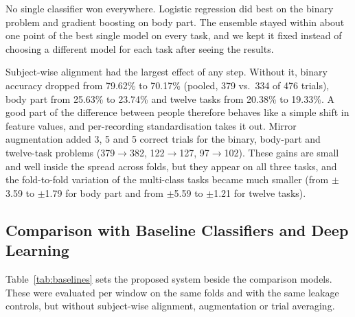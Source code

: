 \documentclass[pdflatex,sn-mathphys-num]{sn-jnl}%
\theoremstyle{thmstyleone}%
\theoremstyle{thmstyletwo}%
\theoremstyle{thmstylethree}%
\begin{document}
No single classifier won everywhere. Logistic regression did best on the binary problem and gradient boosting on body part. The ensemble stayed within about one point of the best single model on every task, and we kept it fixed instead of choosing a different model for each task after seeing the results.

Subject-wise alignment had the largest effect of any step. Without it, binary accuracy dropped from 79.62\% to 70.17\% (pooled, 379 vs.\ 334 of 476 trials), body part from 25.63\% to 23.74\% and twelve tasks from 20.38\% to 19.33\%. A good part of the difference between people therefore behaves like a simple shift in feature values, and per-recording standardisation takes it out. Mirror augmentation added 3, 5 and 5 correct trials for the binary, body-part and twelve-task problems (379$\to$382, 122$\to$127, 97$\to$102). These gains are small and well inside the spread across folds, but they appear on all three tasks, and the fold-to-fold variation of the multi-class tasks became much smaller (from $\pm$3.59 to $\pm$1.79 for body part and from $\pm$5.59 to $\pm$1.21 for twelve tasks).

\subsection{Comparison with Baseline Classifiers and Deep Learning}\label{subsec:baselines}

Table~\ref{tab:baselines} sets the proposed system beside the comparison models. These were evaluated per window on the same folds and with the same leakage controls, but without subject-wise alignment, augmentation or trial averaging.
\end{document}
